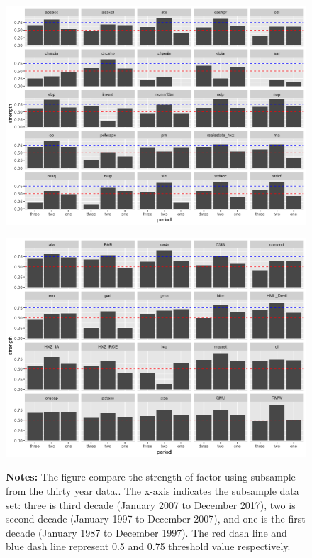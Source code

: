 \begin{landscape}
	\begin{figure}[ht]
		\includegraphics[scale = 0.75]{thirty_decompose_V}
		\centering
	\end{figure}
\end{landscape}

\begin{landscape}
	\begin{figure}[ht]
		\includegraphics[scale = 0.75]{thirty_decompose_VI}
		\centering
		\begin{minipage}{\textwidth}
			{\footnotesize {\bf Notes:} The figure compare the strength of factor using subsample from the thirty year data.. The x-axis indicates the subsample data set: three is third decade (January 2007 to December 2017), two is second decade (January 1997 to December 2007), and one is the first decade (January 1987 to December 1997). The red dash line and blue dash line represent 0.5 and 0.75 threshold value respectively.}
		\end{minipage}
	\end{figure}
\end{landscape}

